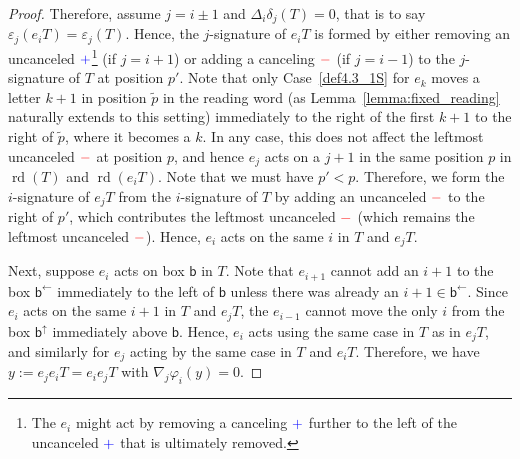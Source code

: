 \documentclass[ALCO,ThmDefs,Unicode,epreuves]{cedram}
\newcommand{\bbb}{\mathsf{b}}
\DeclareMathOperator{\rd}{rd} %
\newcommand{\bplus}{{\color{blue}+}}
\newcommand{\bminus}{{\color{red}-}}
\begin{document}
\begin{proof}
Therefore, assume $j = i \pm 1$ and $\Delta_i \delta_j(T) = 0$, that is to say $\varepsilon_j(e_i T) = \varepsilon_j(T)$. Hence, the $j$-signature of $e_i T$ is formed by either removing an uncanceled $\bplus$\footnote{The $e_i$ might act by removing a canceling $\bplus$ further to the left of the uncanceled $\bplus$ that is ultimately removed.} (if $j = i+1$) or adding a canceling $\bminus$ (if $j = i-1$) to the $j$-signature of $T$ at position $p'$. Note that only Case~\ref{def4.3_1S} for $e_k$ moves a letter $k+1$ in position $\widetilde{p}$ in the reading word (as Lemma~\ref{lemma:fixed_reading} naturally extends to this setting) immediately to the right of the first $k+1$ to the right of $\widetilde{p}$, where it becomes a $k$. In any case, this does not affect the leftmost uncanceled $\bminus$ at position $p$, and hence $e_j$ acts on a $j+1$ in the same position $p$ in $\rd(T)$ and $\rd(e_i T)$. Note that we must have $p' < p$. Therefore, we form the $i$-signature of $e_j T$ from the $i$-signature of $T$ by adding an uncanceled $\bminus$ to the right of $p'$, which contributes the leftmost uncanceled $\bminus$ (which remains the leftmost uncanceled $\bminus$). Hence, $e_i$ acts on the same $i$ in $T$ and $e_j T$.

Next, suppose $e_i$ acts on box $\bbb$ in $T$. Note that $e_{i+1}$ cannot add an $i+1$ to the box $\bbb^{\leftarrow}$ immediately to the left of $\bbb$ unless there was already an $i+1 \in \bbb^{\leftarrow}$. Since $e_i$ acts on the same $i+1$ in $T$ and $e_j T$, the $e_{i-1}$ cannot move the only $i$ from the box $\bbb^{\uparrow}$ immediately above $\bbb$. Hence, $e_i$ acts using the same case in $T$ as in $e_j T$, and similarly for $e_j$ acting by the same case in $T$ and $e_i T$.
Therefore, we have $y := e_j e_i T = e_i e_j T$ with $\nabla_j \varphi_i(y) = 0$.


\end{proof}
\end{document}
